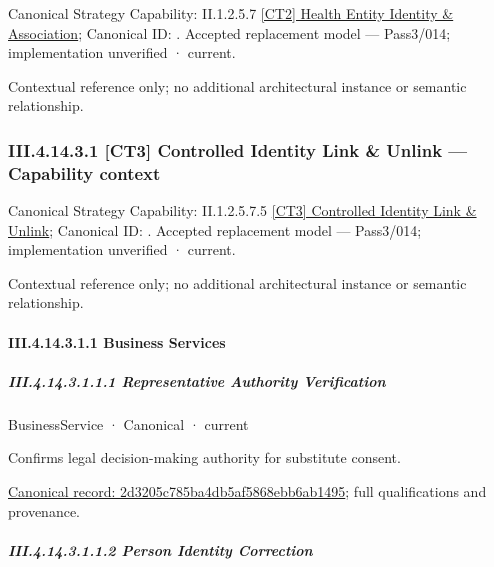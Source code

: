 {\small Canonical Strategy Capability: II.1.2.5.7 \hyperref[element:7cbb4c6253164e19ab3a126c8f176f21]{[CT2] Health Entity Identity \& Association}; Canonical ID: \texttt{}. Accepted replacement model — Pass3/014; implementation unverified · current.}\par
Contextual reference only; no additional architectural instance or semantic relationship.\par
\subsubsection*{III.4.14.3.1 [CT3] Controlled Identity Link \& Unlink — Capability context}
\label{navigation:III.4.14.3.1}

{\small Canonical Strategy Capability: II.1.2.5.7.5 \hyperref[element:34f95770622e4077a87a669f9b279019]{[CT3] Controlled Identity Link \& Unlink}; Canonical ID: \texttt{}. Accepted replacement model — Pass3/014; implementation unverified · current.}\par
Contextual reference only; no additional architectural instance or semantic relationship.\par
\paragraph*{III.4.14.3.1.1 Business Services}
\label{navigation:III.4.14.3.1.1}

\subparagraph*{III.4.14.3.1.1.1 Representative Authority Verification}
\label{navigation:III.4.14.3.1.1.1}

\label{element:2d3205c785ba4db5af5868ebb6ab1495}
{\small BusinessService · Canonical · current}\par

Confirms legal decision-making authority for substitute consent.


{\footnotesize \href{../../../../../../../continuum/business/business-service/2d3205c785ba4db5af5868ebb6ab1495.md}{Canonical record: 2d3205c785ba4db5af5868ebb6ab1495}; full qualifications and provenance.}\par
\subparagraph*{III.4.14.3.1.1.2 Person Identity Correction}
\label{navigation:III.4.14.3.1.1.2}

